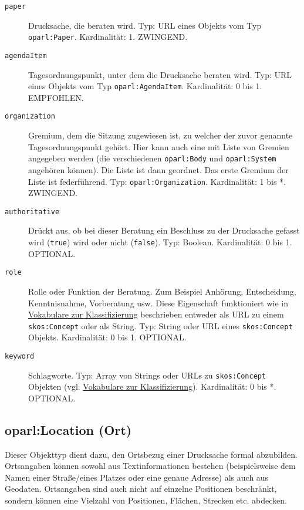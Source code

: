 \documentclass[,a4paper]{article}
\begin{document}
\begin{description}
\item[\texttt{paper}]
Drucksache, die beraten wird. Typ: URL eines Objekts vom Typ
\texttt{oparl:Paper}. Kardinalität: 1. ZWINGEND.
\item[\texttt{agendaItem}]
Tagesordnungspunkt, unter dem die Drucksache beraten wird. Typ: URL
eines Objekts vom Typ \texttt{oparl:AgendaItem}. Kardinalität: 0 bis 1.
EMPFOHLEN.
\item[\texttt{organization}]
Gremium, dem die Sitzung zugewiesen ist, zu welcher der zuvor genannte
Tagesordnungspunkt gehört. Hier kann auch eine mit Liste von Gremien
angegeben werden (die verschiedenen \texttt{oparl:Body} und
\texttt{oparl:System} angehören können). Die Liste ist dann geordnet.
Das erste Gremium der Liste ist federführend. Typ:
\texttt{oparl:Organization}. Kardinalität: 1 bis *. ZWINGEND.
\item[\texttt{authoritative}]
Drückt aus, ob bei dieser Beratung ein Beschluss zu der Drucksache
gefasst wird (\texttt{true}) wird oder nicht (\texttt{false}). Typ:
Boolean. Kardinalität: 0 bis 1. OPTIONAL.
\item[\texttt{role}]
Rolle oder Funktion der Beratung. Zum Beispiel Anhörung, Entscheidung,
Kenntnisnahme, Vorberatung usw. Diese Eigenschaft funktioniert wie in
\hyperref[vokabulareux5fklassifizierung]{Vokabulare zur Klassifizierung}
beschrieben entweder als URL zu einem \texttt{skos:Concept} oder als
String. Typ: String oder URL eines \texttt{skos:Concept} Objekts.
Kardinalität: 0 bis 1. OPTIONAL.
\item[\texttt{keyword}]
Schlagworte. Typ: Array von Strings oder URLs zu \texttt{skos:Concept}
Objekten (vgl. \hyperref[vokabulareux5fklassifizierung]{Vokabulare zur
Klassifizierung}). Kardinalität: 0 bis *. OPTIONAL.
\end{description}

\subsection{oparl:Location (Ort)}\label{oparlux5flocation}

Dieser Objekttyp dient dazu, den Ortsbezug einer Drucksache formal
abzubilden. Ortsangaben können sowohl aus Textinformationen bestehen
(beispielsweise dem Namen einer Straße/eines Platzes oder eine genaue
Adresse) als auch aus Geodaten. Ortsangaben sind auch nicht auf einzelne
Positionen beschränkt, sondern können eine Vielzahl von Positionen,
Flächen, Strecken etc. abdecken.
\end{document}
